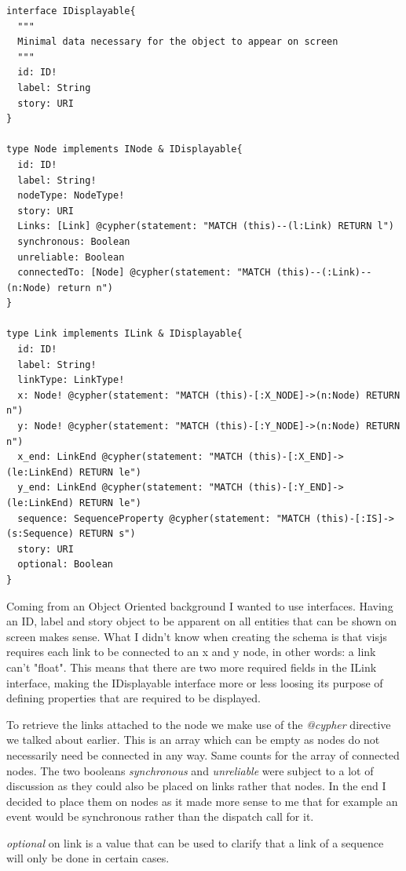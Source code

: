 \begin{lstlisting}
interface IDisplayable{
  """
  Minimal data necessary for the object to appear on screen
  """
  id: ID!
  label: String
  story: URI
}

type Node implements INode & IDisplayable{
  id: ID!
  label: String!
  nodeType: NodeType!
  story: URI
  Links: [Link] @cypher(statement: "MATCH (this)--(l:Link) RETURN l")
  synchronous: Boolean
  unreliable: Boolean
  connectedTo: [Node] @cypher(statement: "MATCH (this)--(:Link)--(n:Node) return n")
}
  
type Link implements ILink & IDisplayable{
  id: ID!
  label: String!
  linkType: LinkType!
  x: Node! @cypher(statement: "MATCH (this)-[:X_NODE]->(n:Node) RETURN n")
  y: Node! @cypher(statement: "MATCH (this)-[:Y_NODE]->(n:Node) RETURN n")
  x_end: LinkEnd @cypher(statement: "MATCH (this)-[:X_END]->(le:LinkEnd) RETURN le")
  y_end: LinkEnd @cypher(statement: "MATCH (this)-[:Y_END]->(le:LinkEnd) RETURN le")
  sequence: SequenceProperty @cypher(statement: "MATCH (this)-[:IS]->(s:Sequence) RETURN s")
  story: URI
  optional: Boolean
}

\end{lstlisting}
Coming from an Object Oriented background I wanted to use interfaces.  Having an ID, label and story object to be apparent on all entities that can be shown on screen makes sense. What I didn't know when creating the schema is that visjs requires each link to be connected to an x and y node, in other words: a link can't "float". This means that there are two more required fields in the ILink interface, making the IDisplayable interface more or less loosing its purpose of defining properties that are required to be displayed.

To retrieve the links attached to the node we make use of the \emph{@cypher} directive we talked about earlier. This is an array which can be empty as nodes do not necessarily need be connected in any way. Same counts for the array of connected nodes. The two booleans \emph{synchronous} and \emph{unreliable} were subject to a lot of discussion as they could also be placed on links rather that nodes. In the end I decided to place them on nodes as it made more sense to me that for example an event would be synchronous rather than the dispatch call for it.

\emph{optional} on link is a value that can be used to clarify that a link of a sequence will only be done in certain cases.

